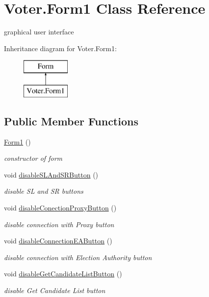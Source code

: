 \hypertarget{class_voter_1_1_form1}{}\section{Voter.\+Form1 Class Reference}
\label{class_voter_1_1_form1}


graphical user interface  


Inheritance diagram for Voter.\+Form1\+:\begin{figure}[H]
\begin{center}
\leavevmode
\includegraphics[height=2.000000cm]{class_voter_1_1_form1}
\end{center}
\end{figure}
\subsection*{Public Member Functions}
\begin{DoxyCompactItemize}
\item 
\hyperlink{class_voter_1_1_form1_a9d2419fe5a38bf455e7748b97c8b822c}{Form1} ()
\begin{DoxyCompactList}\small\item\em constructor of form \end{DoxyCompactList}\item 
void \hyperlink{class_voter_1_1_form1_a57dbc9331963aca6a28c141e2ce10276}{disable\+S\+L\+And\+S\+R\+Button} ()
\begin{DoxyCompactList}\small\item\em disable S\+L and S\+R buttons \end{DoxyCompactList}\item 
void \hyperlink{class_voter_1_1_form1_a9894005297c9c2837e59173c4fe57ad7}{disable\+Conection\+Proxy\+Button} ()
\begin{DoxyCompactList}\small\item\em disable connection with Proxy button \end{DoxyCompactList}\item 
void \hyperlink{class_voter_1_1_form1_a52871090531374025dbf70591855706f}{disable\+Connection\+E\+A\+Button} ()
\begin{DoxyCompactList}\small\item\em disable connection with Election Authority button \end{DoxyCompactList}\item 
void \hyperlink{class_voter_1_1_form1_aa1aea95e72637894339d9dfb6d386ef6}{disable\+Get\+Candidate\+List\+Button} ()
\begin{DoxyCompactList}\small\item\em disable Get Candidate List button \end{DoxyCompactList}\end{DoxyCompactItemize}
